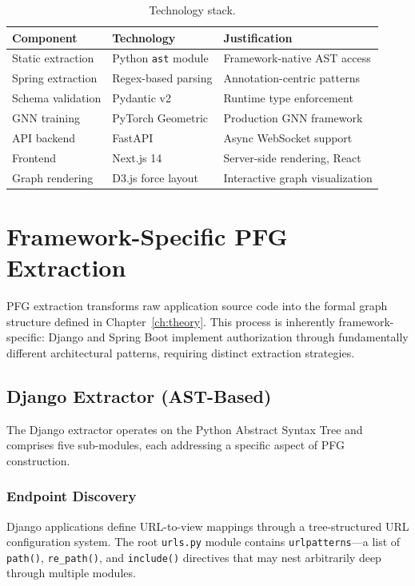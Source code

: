 \begin{table}[htbp]
\centering
\caption{Technology stack.}
\label{tab:tech-stack}
\small
\begin{tabular}{@{}lll@{}}
\toprule
\textbf{Component} & \textbf{Technology} & \textbf{Justification} \\
\midrule
Static extraction & Python \texttt{ast} module & Framework-native AST access \\
Spring extraction & Regex-based parsing & Annotation-centric patterns \\
Schema validation & Pydantic v2 & Runtime type enforcement \\
GNN training & PyTorch Geometric & Production GNN framework \\
API backend & FastAPI & Async WebSocket support \\
Frontend & Next.js 14 & Server-side rendering, React \\
Graph rendering & D3.js force layout & Interactive graph visualization \\
\bottomrule
\end{tabular}
\end{table}

\section{Framework-Specific PFG Extraction}
\label{sec:extractors}

PFG extraction transforms raw application source code into the formal graph structure defined in Chapter~\ref{ch:theory}. This process is inherently framework-specific: Django and Spring Boot implement authorization through fundamentally different architectural patterns, requiring distinct extraction strategies.

\subsection{Django Extractor (AST-Based)}

The Django extractor operates on the Python Abstract Syntax Tree and comprises five sub-modules, each addressing a specific aspect of PFG construction.

\subsubsection{Endpoint Discovery}

Django applications define URL-to-view mappings through a tree-structured URL configuration system. The root \texttt{urls.py} module contains \texttt{urlpatterns}—a list of \texttt{path()}, \texttt{re\_path()}, and \texttt{include()} directives that may nest arbitrarily deep through multiple modules.

